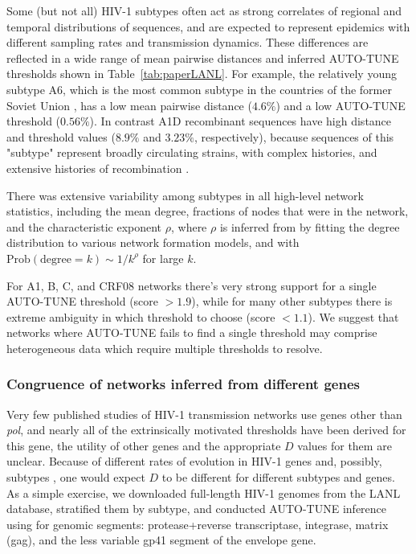 \documentclass[utf8]{FrontiersinHarvard} %
\begin{document}
Some (but not all) HIV-1 subtypes often act as strong correlates of regional
and temporal distributions of sequences, and are expected to represent
epidemics with different sampling rates and transmission dynamics. These
differences are reflected in a wide range of mean pairwise distances and
inferred AUTO-TUNE thresholds shown in Table~\ref{tab:paperLANL}. For example,
the relatively young subtype A6, which is the most common subtype in the
countries of the former Soviet Union \cite{Abidi:2021aa}, has a low mean
pairwise distance ($4.6\%$) and a low AUTO-TUNE threshold ($0.56\%$). In
contrast A1D recombinant sequences have high distance and threshold values
($8.9\%$ and $3.23\%$, respectively), because sequences of this "subtype"
represent broadly circulating strains, with complex histories, and extensive
histories of recombination \cite{Foster:2014aa,Yebra:2015aa}.

There was extensive variability among subtypes in all high-level network
statistics, including the mean degree, fractions of nodes that were in the
network, and the characteristic exponent $\rho$, where $\rho$ is inferred from
by fitting the degree distribution to various network formation models, and
with $\text{Prob}(\text{degree} = k) \sim 1/k^\rho$ for large $k$.

For A1, B, C, and CRF08 networks there's very strong support for a single
AUTO-TUNE threshold (score $>1.9$), while for many other subtypes there is
extreme ambiguity in which threshold to choose (score $<1.1$). We suggest that
networks where AUTO-TUNE fails to find a single threshold may comprise
heterogeneous data which require multiple thresholds to resolve.

\subsubsection{Congruence of networks inferred from different genes}

Very few published studies of HIV-1 transmission networks use genes other than
	{\it pol}, and nearly all of the extrinsically motivated thresholds have been
derived for this gene, the utility of other genes and the appropriate $D$
values for them are unclear. Because of different rates of evolution in HIV-1
genes and, possibly, subtypes \cite{Penn:2008aa}, one would expect $D$ to be
different for different subtypes and genes. As a simple exercise, we downloaded
full-length HIV-1 genomes from the LANL database, stratified them by subtype,
and conducted AUTO-TUNE inference using for genomic segments: protease+reverse
transcriptase, integrase, matrix (gag), and the less variable gp41 segment of
the envelope gene.
\end{document}

